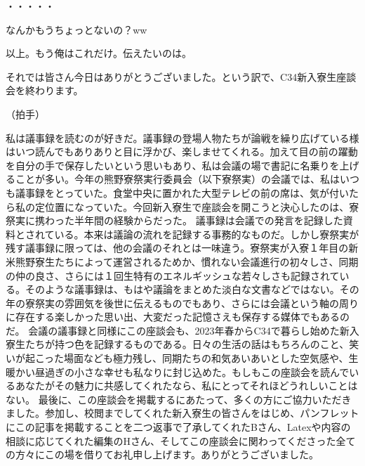 \begin{multicols}{2}
  
・・・・・

  
なんかもうちょっとないの？ww

  
以上。もう俺はこれだけ。伝えたいのは。

  
それでは皆さん今日はありがとうございました。という訳で、C34新入寮生座談会を終わります。

  
（拍手）
\end{multicols}

\newpage
{}
\vspace{3mm}
\newline \quad 私は議事録を読むのが好きだ。議事録の登場人物たちが論戦を繰り広げている様はいつ読んでもありありと目に浮かび、楽しませてくれる。加えて目の前の躍動を自分の手で保存したいという思いもあり、私は会議の場で書記に名乗りを上げることが多い。今年の熊野寮祭実行委員会（以下寮祭実）の会議では、私はいつも議事録をとっていた。食堂中央に置かれた大型テレビの前の席は、気が付いたら私の定位置になっていた。今回新入寮生で座談会を開こうと決心したのは、寮祭実に携わった半年間の経験からだった。
\newline \quad 議事録は会議での発言を記録した資料とされている。本来は議論の流れを記録する事務的なものだ。しかし寮祭実が残す議事録に限っては、他の会議のそれとは一味違う。寮祭実が入寮１年目の新米熊野寮生たちによって運営されるためか、慣れない会議進行の初々しさ、同期の仲の良さ、さらには１回生特有のエネルギッシュな若々しさも記録されている。そのような議事録は、もはや議論をまとめた淡白な文書などではない。その年の寮祭実の雰囲気を後世に伝えるものでもあり、さらには会議という軸の周りに存在する楽しかった思い出、大変だった記憶さえも保存する媒体でもあるのだ。
\newline \quad 会議の議事録と同様にこの座談会も、2023年春からC34で暮らし始めた新入寮生たちが持つ色を記録するものである。日々の生活の話はもちろんのこと、笑いが起こった場面なども極力残し、同期たちの和気あいあいとした空気感や、生暖かい昼過ぎの小さな幸せも私なりに封じ込めた。もしもこの座談会を読んでいるあなたがその魅力に共感してくれたなら、私にとってそれほどうれしいことはない。
\newline
\newline \quad 最後に、この座談会を掲載するにあたって、多くの方にご協力いただきました。参加し、校閲までしてくれた新入寮生の皆さんをはじめ、パンフレットにこの記事を掲載することを二つ返事で了承してくれたBさん、Latexや内容の相談に応じてくれた編集のHさん、そしてこの座談会に関わってくださった全ての方々にこの場を借りてお礼申し上げます。ありがとうございました。
\newline {}

